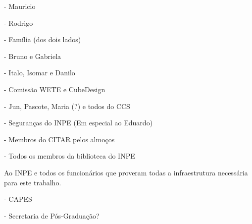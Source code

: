 
\begin{agradecimentos}  %

\hypertarget{estilo:agradecimentos}{} %

- Mauricio

- Rodrigo

- Família (dos dois lados)

- Bruno e Gabriela

- Italo, Isomar e Danilo

- Comissão WETE e CubeDesign

- Jun, Pascote, Maria (?) e todos do CCS

- Seguranças do INPE (Em especial ao Eduardo)

- Membros do CITAR pelos almoços

- Todos os membros da biblioteca do INPE

Ao INPE e todos os funcionários que proveram todas a infraestrutura necessária para este trabalho.

- CAPES

- Secretaria de Pós-Graduação?

\end{agradecimentos}


